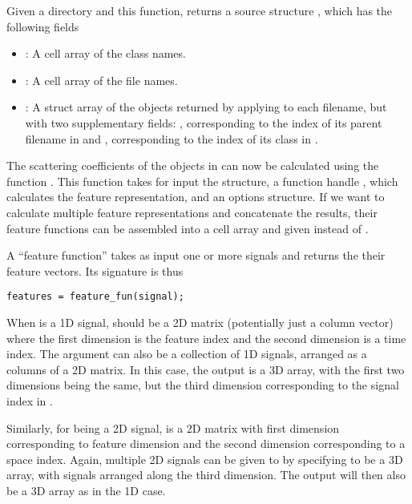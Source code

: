 \documentclass{article}
\begin{document}
Given a directory and this function,  returns a source structure , which has the following fields
\begin{itemize}
	\item {}: A cell array of the class names.
	\item {}: A cell array of the file names.
	\item {}: A struct array of the objects returned by applying  to each filename, but with two supplementary fields: , corresponding to the index of its parent filename in  and , corresponding to the index of its class in .
\end{itemize}

The scattering coefficients of the objects in  can now be calculated using the function . This function takes for input the  structure, a function handle , which calculates the feature representation, and an options structure. If we want to calculate multiple feature representations and concatenate the results, their feature functions can be assembled into a cell array and given instead of .

A ``feature function'' takes as input one or more signals and returns the their feature vectors. Its signature is thus
\begin{lstlisting}
features = feature_fun(signal);
\end{lstlisting}

When  is a 1D signal,  should be a 2D matrix (potentially just a column vector) where the first dimension is the feature index and the second dimension is a time index. The  argument can also be a collection of 1D signals, arranged as a columns of a 2D matrix. In this case, the output  is a 3D array, with the first two dimensions being the same, but the third dimension corresponding to the signal index in .

Similarly, for  being a 2D signal,  is a 2D matrix with first dimension corresponding to feature dimension and the second dimension corresponding to a space index. Again, multiple 2D signals can be given to  by specifying  to be a 3D array, with signals arranged along the third dimension. The output  will then also be a 3D array as in the 1D case.
\end{document}
